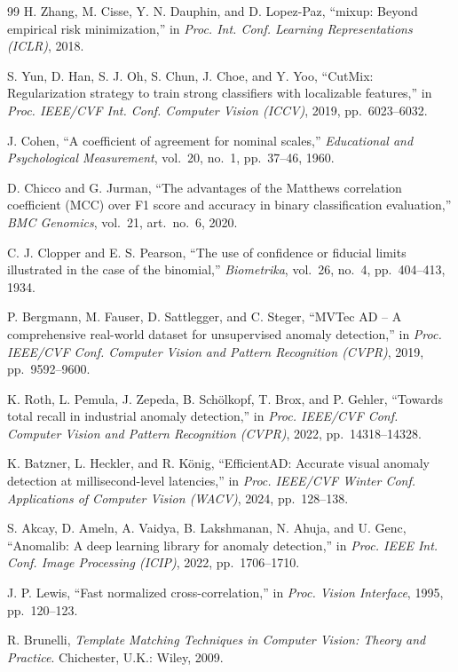 \begin{thebibliography}{99}
H. Zhang, M. Cisse, Y. N. Dauphin, and D. Lopez-Paz,
``mixup: Beyond empirical risk minimization,''
in \emph{Proc. Int. Conf. Learning Representations (ICLR)}, 2018.

S. Yun, D. Han, S. J. Oh, S. Chun, J. Choe, and Y. Yoo,
``CutMix: Regularization strategy to train strong classifiers with localizable features,''
in \emph{Proc. IEEE/CVF Int. Conf. Computer Vision (ICCV)}, 2019, pp.~6023--6032.

J. Cohen,
``A coefficient of agreement for nominal scales,''
\emph{Educational and Psychological Measurement}, vol.~20, no.~1, pp.~37--46, 1960.

D. Chicco and G. Jurman,
``The advantages of the Matthews correlation coefficient (MCC) over F1 score and accuracy in binary classification evaluation,''
\emph{BMC Genomics}, vol.~21, art.~no.~6, 2020.

C. J. Clopper and E. S. Pearson,
``The use of confidence or fiducial limits illustrated in the case of the binomial,''
\emph{Biometrika}, vol.~26, no.~4, pp.~404--413, 1934.

P. Bergmann, M. Fauser, D. Sattlegger, and C. Steger,
``MVTec AD -- A comprehensive real-world dataset for unsupervised anomaly detection,''
in \emph{Proc. IEEE/CVF Conf. Computer Vision and Pattern Recognition (CVPR)}, 2019, pp.~9592--9600.

K. Roth, L. Pemula, J. Zepeda, B. Sch\"olkopf, T. Brox, and P. Gehler,
``Towards total recall in industrial anomaly detection,''
in \emph{Proc. IEEE/CVF Conf. Computer Vision and Pattern Recognition (CVPR)}, 2022, pp.~14318--14328.

K. Batzner, L. Heckler, and R. K\"onig,
``EfficientAD: Accurate visual anomaly detection at millisecond-level latencies,''
in \emph{Proc. IEEE/CVF Winter Conf. Applications of Computer Vision (WACV)}, 2024, pp.~128--138.

S. Akcay, D. Ameln, A. Vaidya, B. Lakshmanan, N. Ahuja, and U. Genc,
``Anomalib: A deep learning library for anomaly detection,''
in \emph{Proc. IEEE Int. Conf. Image Processing (ICIP)}, 2022, pp.~1706--1710.

J. P. Lewis,
``Fast normalized cross-correlation,''
in \emph{Proc. Vision Interface}, 1995, pp.~120--123.

R. Brunelli,
\emph{Template Matching Techniques in Computer Vision: Theory and Practice}.
Chichester, U.K.: Wiley, 2009.


\end{thebibliography}
